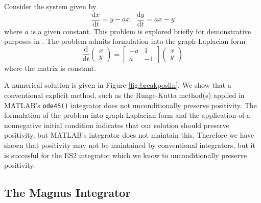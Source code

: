 Consider the system given by
\begin{equation}
    \frac{\mathrm{d}x}{\mathrm{d}t} = y - ax,~~ \frac{\mathrm{d}y}{\mathrm{d}t} = ax - y
    \label{eqn:alineartestproblem}
\end{equation}
where $a$ is a given constant. This problem is explored briefly for demonstrative purposes in \cite{broekhuizen_biochem_2008}.
The problem admits formulation into the graph-Laplacian form
\begin{equation*}
    \frac{\mathrm{d}}{\mathrm{d}t}\begin{pmatrix}
        x \\
        y
    \end{pmatrix} = \begin{bmatrix}
        -a & 1 \\
        a & -1
    \end{bmatrix} \begin{pmatrix}
        x \\
        y
    \end{pmatrix}
\end{equation*}
where the matrix is constant.

A numerical solution is given in Figure \ref{fig:breakposlin}.
We show that a conventional explicit method, such as the Runge-Kutta method(s) applied in MATLAB's \texttt{ode45()} integrator does not unconditionally preserve positivity.
The formulation of the problem into graph-Laplacian form and the application of a nonnegative initial condition indicates that our solution should preserve positivity, but MATLAB's integrator does not maintain this.
Therefore we have shown that positivity may not be maintained by conventional integrators,
but it is succesful for the ES2 integrator which we know to unconditionally preserve positivity.

\subsection{The Magnus Integrator}

